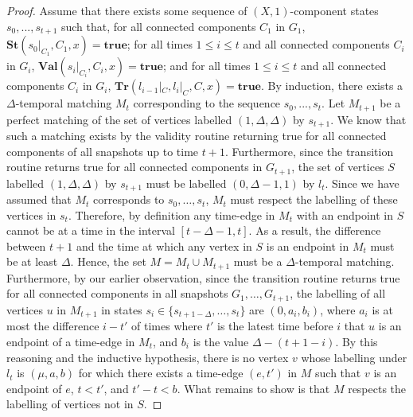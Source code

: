 \documentclass[a4paper,UKenglish,cleveref, autoref, thm-restate]{lipics-v2021} %
\begin{document}
\begin{toappendix}
\begin{proof}
    Assume that there exists some sequence of $(X,1)$-component states $s_0, ..., s_{t+1}$ such that, for all connected components $C_1$ in $G_1$, $\textbf{St}(s_0|_{C_1}, C_1,x)=\textbf{true}$; for all times $1\leq i\leq t$ and all connected components $C_{i}$ in $G_{i}$, $\textbf{Val}(s_{i}|_{C_{i}}, C_{i},x)=\textbf{true}$; and for all times $1\leq i\leq t$ and all connected components $C_{i}$ in $G_{i}$, $\textbf{Tr}(l_{i-1}|_C, l_i|_C, C,x)=\textbf{true}$. By induction, there exists a $\Delta$-temporal matching $M_{t}$ corresponding to the sequence $s_0, ..., s_{t}$. Let $M_{t+1}$ be a perfect matching of the set of vertices labelled $(1,\Delta,\Delta)$ by $s_{t+1}$. We know that such a matching exists by the validity routine returning true for all connected components of all snapshots up to time $t+1$. Furthermore, since the transition routine returns true for all connected components in $G_{t+1}$, the set of vertices $S$ labelled $(1,\Delta,\Delta)$ by $s_{t+1}$ must be labelled $(0,\Delta-1,1)$ by $l_t$. Since we have assumed that $M_t$ corresponds to $s_0,\ldots,s_t$, $M_t$ must respect the labelling of these vertices in $s_t$. Therefore, by definition any time-edge in $M_t$ with an endpoint in $S$ cannot be at a time in the interval $[t-\Delta-1,t]$. As a result, the difference between $t+1$ and the time at which any vertex in $S$ is an endpoint in $M_t$ must be at least $\Delta$. Hence, the set $M=M_t\cup M_{t+1}$ must be a $\Delta$-temporal matching. Furthermore, by our earlier observation, since the transition routine returns true for all connected components in all snapshots $G_1,\ldots,G_{t+1}$, the labelling of all vertices $u$ in $M_{t+1}$ in states $s_i\in \{s_{t+1-\Delta},\ldots, s_t\}$ are $(0,a_i,b_i)$, where $a_i$ is at most the difference $i-t'$ of times where $t'$ is the latest time before $i$ that $u$ is an endpoint of a time-edge in $M_t$, and $b_i$ is the value $\Delta-(t+1-i)$. By this reasoning and the inductive hypothesis, there is no vertex $v$ whose labelling under $l_t$ is $(\mu,a,b)$ for which there exists a time-edge $(e,t')$ in $M$ such that $v$ is an endpoint of $e$, $t< t'$, and $t'-t<b$.
   What remains to show is that $M$ respects the labelling of vertices not in $S$.


\end{proof}
\end{toappendix}
\end{document}
